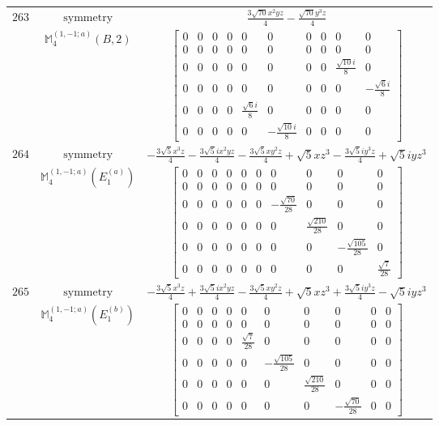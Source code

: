 \documentclass[fleqn,8pt,landscape]{jsarticle}
\begin{document}
\begin{longtable}{ccc}
$ 263 $ & $ \text{symmetry} $ & $ \frac{3 \sqrt{70} x^{2} y z}{4} - \frac{\sqrt{70} y^{3} z}{4} $ \\
$  $ & $ \mathbb{M}_{4}^{(1,-1;a)}(B,2) $ & $ \begin{bmatrix} 0 & 0 & 0 & 0 & 0 & 0 & 0 & 0 & 0 & 0 \\ 0 & 0 & 0 & 0 & 0 & 0 & 0 & 0 & 0 & 0 \\ 0 & 0 & 0 & 0 & 0 & 0 & 0 & 0 & \frac{\sqrt{10} i}{8} & 0 \\ 0 & 0 & 0 & 0 & 0 & 0 & 0 & 0 & 0 & - \frac{\sqrt{6} i}{8} \\ 0 & 0 & 0 & 0 & \frac{\sqrt{6} i}{8} & 0 & 0 & 0 & 0 & 0 \\ 0 & 0 & 0 & 0 & 0 & - \frac{\sqrt{10} i}{8} & 0 & 0 & 0 & 0 \end{bmatrix} $ \\ \hline
$ 264 $ & $ \text{symmetry} $ & $ - \frac{3 \sqrt{5} x^{3} z}{4} - \frac{3 \sqrt{5} i x^{2} y z}{4} - \frac{3 \sqrt{5} x y^{2} z}{4} + \sqrt{5} x z^{3} - \frac{3 \sqrt{5} i y^{3} z}{4} + \sqrt{5} i y z^{3} $ \\
$  $ & $ \mathbb{M}_{4}^{(1,-1;a)}(E_{1}^{(a)}) $ & $ \begin{bmatrix} 0 & 0 & 0 & 0 & 0 & 0 & 0 & 0 & 0 & 0 \\ 0 & 0 & 0 & 0 & 0 & 0 & 0 & 0 & 0 & 0 \\ 0 & 0 & 0 & 0 & 0 & 0 & - \frac{\sqrt{70}}{28} & 0 & 0 & 0 \\ 0 & 0 & 0 & 0 & 0 & 0 & 0 & \frac{\sqrt{210}}{28} & 0 & 0 \\ 0 & 0 & 0 & 0 & 0 & 0 & 0 & 0 & - \frac{\sqrt{105}}{28} & 0 \\ 0 & 0 & 0 & 0 & 0 & 0 & 0 & 0 & 0 & \frac{\sqrt{7}}{28} \end{bmatrix} $ \\ \hline
$ 265 $ & $ \text{symmetry} $ & $ - \frac{3 \sqrt{5} x^{3} z}{4} + \frac{3 \sqrt{5} i x^{2} y z}{4} - \frac{3 \sqrt{5} x y^{2} z}{4} + \sqrt{5} x z^{3} + \frac{3 \sqrt{5} i y^{3} z}{4} - \sqrt{5} i y z^{3} $ \\
$  $ & $ \mathbb{M}_{4}^{(1,-1;a)}(E_{1}^{(b)}) $ & $ \begin{bmatrix} 0 & 0 & 0 & 0 & 0 & 0 & 0 & 0 & 0 & 0 \\ 0 & 0 & 0 & 0 & 0 & 0 & 0 & 0 & 0 & 0 \\ 0 & 0 & 0 & 0 & \frac{\sqrt{7}}{28} & 0 & 0 & 0 & 0 & 0 \\ 0 & 0 & 0 & 0 & 0 & - \frac{\sqrt{105}}{28} & 0 & 0 & 0 & 0 \\ 0 & 0 & 0 & 0 & 0 & 0 & \frac{\sqrt{210}}{28} & 0 & 0 & 0 \\ 0 & 0 & 0 & 0 & 0 & 0 & 0 & - \frac{\sqrt{70}}{28} & 0 & 0 \end{bmatrix} $ \\ \hline

\end{longtable}
\end{document}
